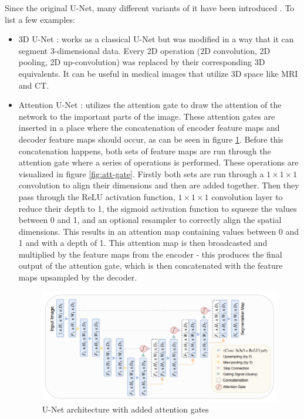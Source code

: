 Since the original U-Net, many different variants of it have been introduced \cite{Siddique2021}. To list a few examples:

\begin{itemize}
    \item 3D U-Net \cite{Çiçek2016}: works as a classical U-Net but was modified in a way that it can segment 3-dimensional data. Every 2D operation (2D convolution, 2D pooling, 2D up-convolution) was replaced by their corresponding  3D equivalents. It can be useful in medical images that utilize 3D space like MRI and CT.
    \item Attention U-Net \cite{Oktay2018}: utilizes the attention gate to draw the attention of the network to the important parts of the image. These attention gates are inserted in a place where the concatenation of encoder feature maps and decoder feature maps should occur, as can be seen in figure \ref{fig:att-unet}. Before this concatenation happens, both sets of feature maps are run through the attention gate where a series of operations is performed. These operations are visualized in figure \ref{fig:att-gate}. Firstly both sets are run through a $1\!\times\!1\!\times\!1$ convolution to align their dimensions and then are added together. Then they pass through the ReLU activation function, $1\!\times\!1\!\times\!1$ convolution layer to reduce their depth to 1, the sigmoid activation function to squeeze the values between 0 and 1, and an optional resampler to correctly align the spatial dimensions. This results in an attention map containing values between 0 and 1 and with a depth of 1. This attention map is then broadcasted and multiplied by the feature maps from the encoder - this produces the final output of the attention gate, which is then concatenated with the feature maps upsampled by the decoder.

    \begin{figure}[H]
    \begin{centering}
    \includegraphics[width=12cm]{assets/images/att-unet.png}
    \par\end{centering}
    \caption{U-Net architecture with added attention gates \cite{Oktay2018}}
    \label{fig:att-unet}
    \end{figure}


\end{itemize}

